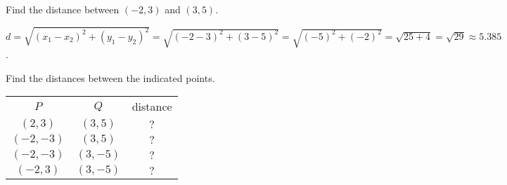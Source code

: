 \begin{frame}
\begin{example}
Find the distance between $(-2,3)$ and $(3,5)$.

$d=\sqrt{(x_1-x_2)^2+(y_1 -y_2)^2}= \sqrt{(-2-3)^2+ (3-5)^2} = \sqrt{(-5)^2+(-2)^2}= \sqrt{25+4}=\sqrt{29}\approx 5.385$.

\end{example}
\begin{example}
Find the distances between the indicated points.
\begin{tabular}{ccc}
$P$& $Q$& distance\\
$(2,3)$   & $(3,5)$ & $\textbf{?}$\\
$(-2,-3)$ & $(3,5)$ & $\textbf{?}$\\
$(-2,-3)$ & $(3,-5)$& $\textbf{?}$\\
$(-2, 3)$ & $(3,-5)$& $\textbf{?}$
\end{tabular}
\end{example}
\end{frame}